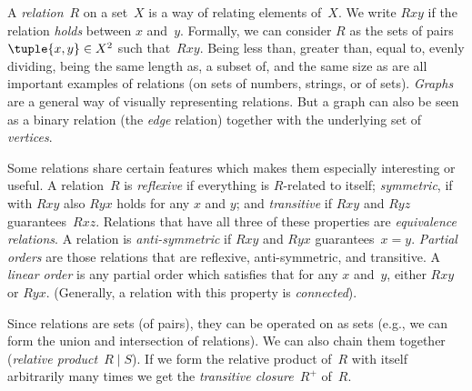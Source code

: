 A \emph{relation}~$R$ on a set~$X$ is a way of relating elements
of~$X$. We write $Rxy$ if the relation \emph{holds} between $x$
and~$y$. Formally, we can consider $R$ as the sets of pairs
$\tuple{x,y} \in X^2$ such that~$Rxy$. Being less than, greater than,
equal to, evenly dividing, being the same length as, a subset of, and the
same size as are all important examples of relations (on
sets of numbers, strings, or of sets). \emph{Graphs} are a general way
of visually representing relations. But a graph can also be seen as a
binary relation (the \emph{edge} relation) together with the
underlying set of \emph{vertices}.

Some relations share certain features which makes them especially
interesting or useful. A relation~$R$ is \emph{reflexive} if
everything is $R$-related to itself; \emph{symmetric}, if with $Rxy$
also $Ryx$ holds for any $x$ and $y$; and \emph{transitive} if $Rxy$
and $Ryz$ guarantees~$Rxz$. Relations that have all three of these
properties are \emph{equivalence relations}. A relation is
\emph{anti-symmetric} if $Rxy$ and $Ryx$
guarantees~$x=y$. \emph{Partial orders} are those relations that are
reflexive, anti-symmetric, and transitive. A \emph{linear order} is
any partial order which satisfies that for any $x$ and~$y$, either
$Rxy$ or $Ryx$. (Generally, a relation with this property is
\emph{connected}).

Since relations are sets (of pairs), they can be operated on as sets
(e.g., we can form the union and intersection of relations). We can
also chain them together (\emph{relative product}~$R \mid S$). If we
form the relative product of~$R$ with itself arbitrarily many times we
get the \emph{transitive closure}~$R^+$ of~$R$.
